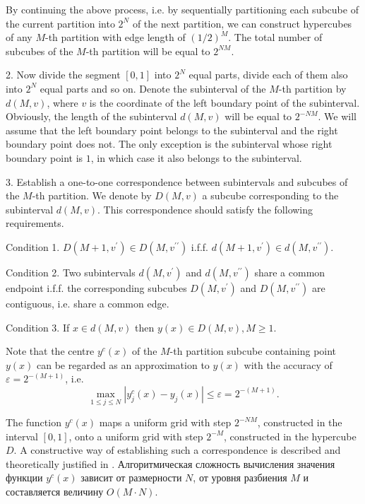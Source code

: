 \documentclass[entropy,article,submit,moreauthors,pdftex]{Definitions/mdpi}
\begin{document}
By continuing the above process, i.e. by sequentially partitioning each subcube of the current partition into $2^N$ of the next partition, we can construct hypercubes of any $M$-th partition with edge length of $(1/2)^M$. The total number of subcubes of the $M$-th partition will be equal to $2^{NM}$.

2. Now divide the segment $[0, 1]$ into $2^N$ equal parts, divide  each of them also into $2^N$ equal parts and so on. Denote the subinterval of the $M$-th partition by $d(M,v)$, where $v$ is the coordinate of the left boundary point of the subinterval. Obviously, the length of the subinterval $d(M,v)$ will be equal to $2^{-NM}$. We will assume that the left boundary point belongs to the subinterval and the right boundary point does not. The only exception is the subinterval whose right boundary point is $1$, in which case it also belongs to the subinterval.

3. Establish a one-to-one correspondence between subintervals and subcubes of the $M$-th partition. We denote by $D(M,v)$ a subcube corresponding to the subinterval $d(M,v)$. This correspondence should satisfy the following requirements.

Condition 1. $D(M+1,v^\prime) \in D(M,v^{\prime\prime})$ i.f.f. $d(M+1,v^\prime) \in d(M,v^{\prime\prime})$.

Condition 2. Two subintervals $d(M,v^\prime)$ and $d(M,v^{\prime\prime})$ share a common endpoint i.f.f. the corresponding subcubes $D(M,v^\prime)$ and $D(M,v^{\prime\prime})$  are  contiguous, i.e. share a common edge.

Condition 3.  If $x \in d(M,v)$ then $y(x) \in D(M,v), M \geq 1$.  

Note that the centre  $y^c(x)$ of the $M$-th partition subcube containing point $y(x)$ can be regarded as an approximation to $y(x)$ with the accuracy of $\varepsilon = 2^{-(M+1)}$, i.e.
\begin{equation}\label{prec}
\max_{1 \leq j \leq N} \left| y_j^c(x)-y_j(x) \right| \leq \varepsilon = 2^{-(M+1)}.
\end{equation} 

The function $y^c(x)$ maps a uniform grid with step $2^{-NM}$, constructed in the interval $[0,1]$, onto a uniform grid with step $2^{-M}$, constructed in the hypercube $D$. A constructive way of establishing such a correspondence is described and theoretically justified in \cite{Strongin2000, Sergeyev2013}. 
Алгоритмическая сложность вычисления значения функции $y^c(x)$ зависит от размерности $N$, от уровня разбиения $M$ и составляется величину $O(M\cdot N)$.
\end{document}
